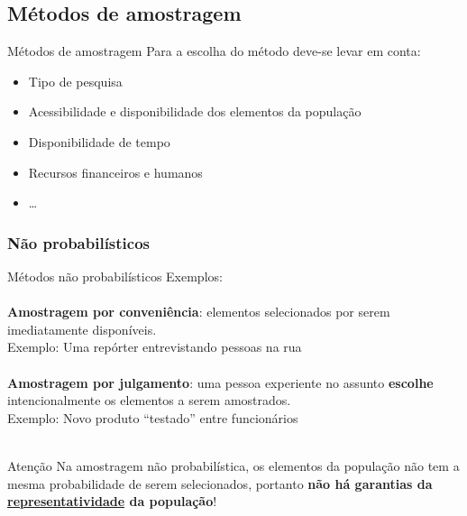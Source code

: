 \documentclass[10pt]{beamer}
\theoremstyle{definition}
\begin{document}
\subsection[Métodos]{Métodos de amostragem}


\begin{frame}{Métodos de amostragem}
  Para a escolha do método deve-se levar em conta:
  \begin{itemize}
  \item Tipo de pesquisa
  \item Acessibilidade e disponibilidade dos elementos da população
  \item Disponibilidade de tempo
  \item Recursos financeiros e humanos
  \item \ldots
  \end{itemize}
\end{frame}

\subsubsection{Não probabilísticos}

\begin{frame}{Métodos não probabilísticos}
  Exemplos: \\~\\
  \textbf{Amostragem por conveniência}: elementos selecionados por serem
  imediatamente disponíveis.\\
  Exemplo: Uma repórter entrevistando pessoas na rua \\~\\
  \textbf{Amostragem por julgamento}: uma pessoa experiente no assunto
  \textbf{escolhe} intencionalmente os elementos a serem amostrados. \\
  Exemplo: Novo produto ``testado'' entre funcionários\\~\\
  \pause
  \begin{alertblock}{Atenção}
    Na amostragem não probabilística, os elementos da população não
    tem a mesma probabilidade de serem selecionados, portanto \textbf{não
    há garantias da \underline{representatividade} da população}!
  \end{alertblock}
\end{frame}
\end{document}
